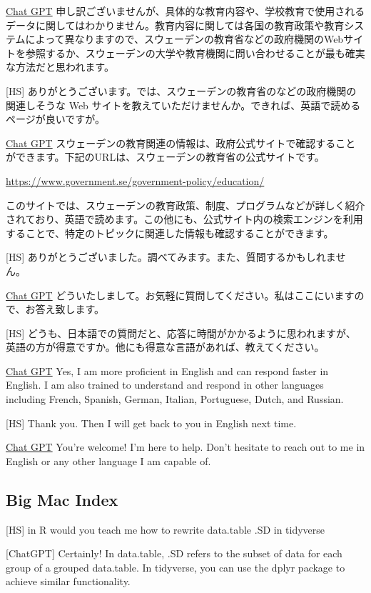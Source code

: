 \documentclass[
]{bxjsbook}
\theoremstyle{definition}
\theoremstyle{definition}
\theoremstyle{definition}
\theoremstyle{definition}
\theoremstyle{remark}
\begin{document}
\protect\hyperlink{chatgpt}{Chat GPT} 申し訳ございませんが、具体的な教育内容や、学校教育で使用されるデータに関してはわかりません。教育内容に関しては各国の教育政策や教育システムによって異なりますので、スウェーデンの教育省などの政府機関のWebサイトを参照するか、スウェーデンの大学や教育機関に問い合わせることが最も確実な方法だと思われます。

{[}HS{]} ありがとうございます。では、スウェーデンの教育省のなどの政府機関の関連しそうな Web サイトを教えていただけませんか。できれば、英語で読めるページが良いですが。

\protect\hyperlink{chatgpt}{Chat GPT} スウェーデンの教育関連の情報は、政府公式サイトで確認することができます。下記のURLは、スウェーデンの教育省の公式サイトです。

\url{https://www.government.se/government-policy/education/}

このサイトでは、スウェーデンの教育政策、制度、プログラムなどが詳しく紹介されており、英語で読めます。この他にも、公式サイト内の検索エンジンを利用することで、特定のトピックに関連した情報も確認することができます。

{[}HS{]} ありがとうございました。調べてみます。また、質問するかもしれません。

\protect\hyperlink{chatgpt}{Chat GPT} どういたしまして。お気軽に質問してください。私はここにいますので、お答え致します。

{[}HS{]} どうも、日本語での質問だと、応答に時間がかかるように思われますが、英語の方が得意ですか。他にも得意な言語があれば、教えてください。

\protect\hyperlink{chatgpt}{Chat GPT} Yes, I am more proficient in English and can respond faster in English. I am also trained to understand and respond in other languages including French, Spanish, German, Italian, Portuguese, Dutch, and Russian.

{[}HS{]} Thank you. Then I will get back to you in English next time.

\protect\hyperlink{chatgpt}{Chat GPT} You're welcome! I'm here to help. Don't hesitate to reach out to me in English or any other language I am capable of.

\hypertarget{bigmacindex}{%
\subsection{Big Mac Index　}\label{bigmacindex}}

{[}HS{]} in R would you teach me how to rewrite data.table .SD in tidyverse

{[}ChatGPT{]} Certainly! In data.table, .SD refers to the subset of data for each group of a grouped data.table. In tidyverse, you can use the dplyr package to achieve similar functionality.
\end{document}
